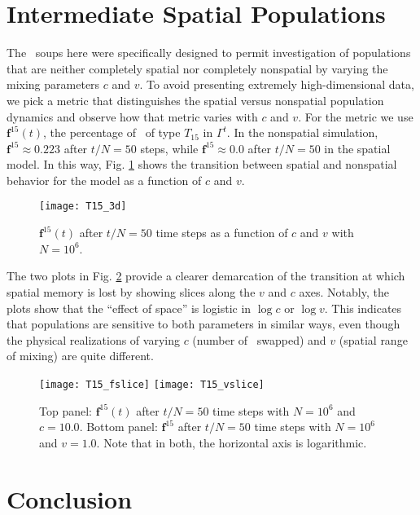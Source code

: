 \documentclass[pre,twocolumn,showpacs,superscriptaddress,preprintnumbers,floatfix]{revtex4}
\theoremstyle{plain}    \newtheorem{Lem}{Lemma}
\theoremstyle{plain}    \newtheorem*{ProLem}{Proof}
\theoremstyle{plain}    \newtheorem{Cor}{Corollary}
\theoremstyle{plain}    \newtheorem*{ProCor}{Proof}
\theoremstyle{plain}    \newtheorem{The}{Theorem}
\theoremstyle{plain}    \newtheorem*{ProThe}{Proof}
\theoremstyle{plain}    \newtheorem{Prop}{Proposition}
\theoremstyle{plain}    \newtheorem*{ProProp}{Proof}
\theoremstyle{plain}    \newtheorem*{Conj}{Conjecture}
\theoremstyle{plain}    \newtheorem*{Rem}{Remark}
\theoremstyle{plain}    \newtheorem{Def}{Definition}
\theoremstyle{plain}    \newtheorem*{Not}{Notation}
\newcommand{\PrEMType}{\mathbf{f}}
\begin{document}
\section{Intermediate Spatial Populations}

The \eM\ soups here were specifically designed to permit investigation of
populations that are neither completely spatial nor completely nonspatial by
varying the mixing parameters $c$ and $v$. To avoid presenting extremely
high-dimensional data, we pick a metric that distinguishes the spatial versus
nonspatial population dynamics and observe how that metric varies with $c$ and
$v$. For the metric we use $\PrEMType^{15} (t)$, the percentage of \eMs\ of type
$T_{15}$ in $\Gamma^t$. In the nonspatial simulation,
$\PrEMType^{15} \approx 0.223$ after $t/N = 50$ steps, while
$\PrEMType^{15} \approx 0.0$ after $t/N = 50$ in the spatial model. In this way,
Fig. \ref{fig:IntermediatePlotsSurface} shows the transition between spatial
and nonspatial behavior for the model as a function of $c$ and $v$. 

\begin{figure}[hbtp]
  \texttt{[image: T15\_3d]}
\caption{$\PrEMType^{15} (t)$ after $t/N = 50$ time steps as a function of
  $c$ and $v$ with $N=10^6$.
  }
\label{fig:IntermediatePlotsSurface}
\end{figure}

The two plots in Fig. \ref{fig:IntermediatePlots} provide a clearer demarcation
of the transition at which spatial memory is lost by showing slices along the
$v$ and $c$ axes. Notably, the plots show that the ``effect of space'' is
logistic in $\log c$ or $\log v$. This indicates that populations are sensitive
to both parameters in similar ways, even though the physical realizations of
varying $c$ (number of \eMs\ swapped) and $v$ (spatial range of mixing) are
quite different. 

\begin{figure}[tp]
  \texttt{[image: T15\_fslice]}
  \texttt{[image: T15\_vslice]}
\caption{Top panel: $\PrEMType^{15} (t)$ after $t/N = 50$ time steps with
  $N=10^6$ and $c=10.0$. Bottom panel: $\PrEMType^{15}$ after $t/N = 50$ time
  steps with $N=10^6$ and $v=1.0$. Note that in both, the horizontal axis is
  logarithmic.
  }
\label{fig:IntermediatePlots}
\end{figure}

\section{Conclusion}
\end{document}
